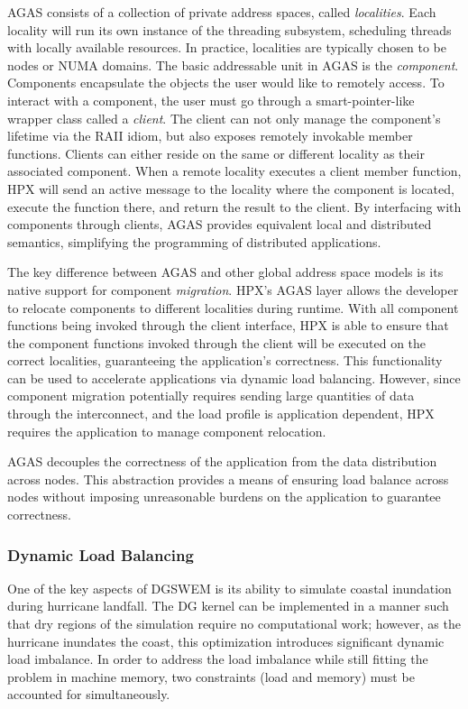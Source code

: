 AGAS consists of a collection of private address spaces, called \emph{localities}. Each locality will run its own instance of the threading subsystem, scheduling threads with locally available resources. In practice, localities are typically chosen to be  nodes or NUMA domains. The basic addressable unit in AGAS is the \emph{component}. Components encapsulate the objects the user would like to remotely access. To interact with a component, the user must go through a smart-pointer-like wrapper class called a \emph{client}. The client can not only manage the component's lifetime via the RAII idiom, but also exposes remotely invokable member functions. Clients can either reside on the same or different locality as their associated component. When a remote locality executes a client member function, HPX will send an active message to the locality where the component is located, execute the function there, and return the result to the client. By interfacing with components through clients, AGAS provides equivalent local and distributed semantics, simplifying the programming of distributed applications.

The key difference between AGAS and other global address space models is its native support for component \emph{migration}. HPX's AGAS layer allows the developer to relocate components to different localities during runtime. With all component functions being invoked through the client interface, HPX is able to ensure that the component functions invoked through the client will be executed on the correct localities, guaranteeing the application's correctness. This functionality can be used to accelerate applications via dynamic load balancing. However, since component migration potentially requires sending large quantities of data through the interconnect, and the load profile is application dependent, HPX requires the application to manage component relocation.

AGAS decouples the correctness of the application from the data distribution across nodes.  This abstraction provides a means of ensuring load balance across nodes without imposing unreasonable burdens on the application to guarantee correctness.

\subsubsection{Dynamic Load Balancing}
One of the key aspects of DGSWEM is its ability to simulate coastal inundation during hurricane landfall.
The DG kernel can be implemented in a manner such that dry regions of the simulation require no computational work; however, as the hurricane inundates the coast, this optimization introduces significant dynamic load imbalance.
In order to address the load imbalance while still fitting the problem in machine memory, two constraints (load and memory) must be accounted for simultaneously.

